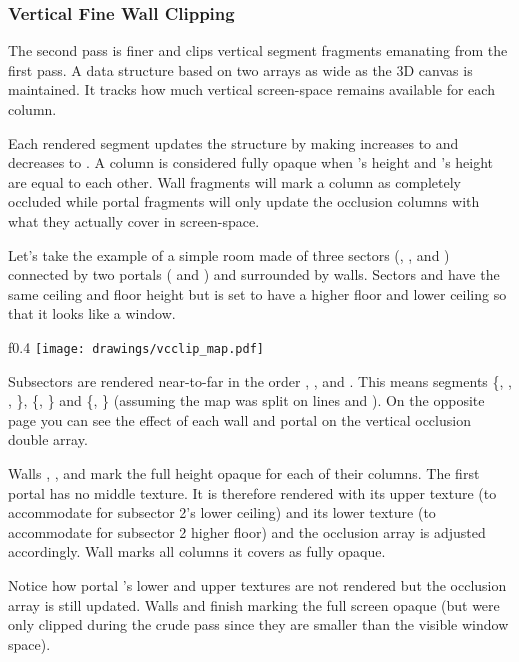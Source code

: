 \subsubsection{Vertical Fine Wall Clipping}
The second pass is finer and clips vertical segment fragments emanating from the first pass. A data structure based on two arrays as wide as the 3D canvas is maintained. It tracks how much vertical screen-space remains available for each column.\\
\par
 Each rendered segment updates the structure by making increases to  and decreases to . A column is considered fully opaque when 's height and 's height are equal to each other. Wall fragments will mark a column as completely occluded while portal fragments will only update the occlusion columns with what they actually cover in screen-space.\\
\par
{}
\par
Let's take the example of a simple room made of three sectors (, , and ) connected by two portals ( and ) and surrounded by walls. Sectors  and  have the same ceiling and floor height but  is set to have a higher floor and lower ceiling so that it looks like a window.\\
\par

\begin{wrapfigure}[14]{f}{0.4\textwidth}
\centering
\texttt{[image: drawings/vcclip\_map.pdf]}
\end{wrapfigure}
Subsectors are rendered near-to-far in the order , , and . This means segments \{, , , \}, \{, \} and \{, \} (assuming the map was split on lines  and ). On the opposite page you can see the effect of each wall and portal on the vertical occlusion double array.\par
\vspace{10pt}
Walls , , and  mark the full height opaque for each of their columns. The first portal  has no middle texture. It is therefore rendered with its upper texture (to accommodate for subsector 2's lower ceiling) and its lower texture (to accommodate for subsector 2 higher floor) and the occlusion array is adjusted accordingly. Wall  marks all columns it covers as fully opaque.\\
\par
Notice how portal 's lower and upper textures are not rendered but the occlusion array is still updated. Walls  and  finish marking the full screen opaque (but were only clipped during the crude pass since they are smaller than the visible window space).


